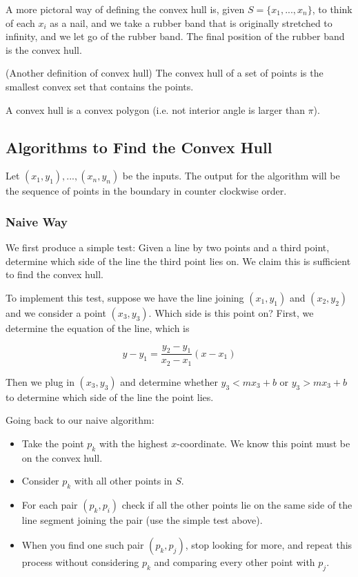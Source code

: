 A more pictoral way of defining the convex hull is, given
$S = \{ x_1, ..., x_n \}$, to think of each $x_i$ as a nail, and
we take a rubber band that is originally stretched to infinity, and we
let go of the rubber band. The final position of the rubber band is
the convex hull.

\begin{definition}
    (Another definition of convex hull) The convex hull of a set of
    points is the smallest convex set that
    contains the points.
\end{definition}

\begin{lemma}
    A convex hull is a convex polygon (i.e. not interior angle is
    larger than $\pi$).
\end{lemma}


\subsection{Algorithms to Find the Convex Hull}

Let $(x_1, y_1), ..., (x_n, y_n)$ be the inputs. The output for the
algorithm will be the sequence of points in the boundary in counter
clockwise order.

\subsubsection{Naive Way}

We first produce a simple test: Given a line
by two points and a third point, determine which side of the line the
third point lies on. We claim this is sufficient to find the convex
hull.

To implement this test, suppose we have the line joining $(x_1, y_1)$
and $(x_2, y_2)$ and we consider a point $(x_3, y_3)$. Which side is
this
point on? First, we determine the equation of the line, which is

$$
y - y_1 = \frac{y_2 - y_1}{x_2 - x_1}(x - x_1)
$$

Then we plug in $(x_3, y_3)$ and determine whether $y_3 < mx_3 + b$
or $y_3 > mx_3 + b$ to determine which side of the line the point
lies.

Going back to our naive algorithm:

\begin{itemize}
    \item Take the point $p_k$ with the highest $x$-coordinate. We
    know this
    point must be on the convex hull.
    \item Consider $p_k$ with all other points in $S$.
    \item For each pair $(p_k, p_i)$ check if all the other points lie
    on the same
    side of the line segment joining the pair (use the simple test
    above).
    \item When you find one such pair $(p_k, p_j)$, stop looking for
    more, and repeat this process without considering $p_k$ and
    comparing every other point with $p_j$.
\end{itemize}


